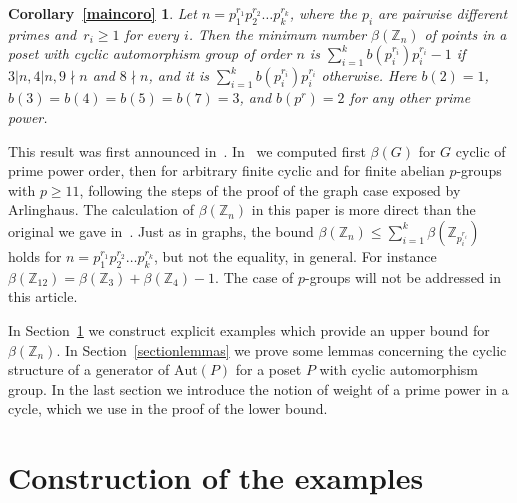 \documentclass[ALCO,published]{cedram}
\newtheorem*{intro1}{Corollary~\ref{maincoro}}
\newcommand{\Z}{\mathbb{Z}}
\newcommand{\aut}{\textrm{Aut}}
\begin{document}
\begin{intro1}
Let $n=p_1^{r_1}p_2^{r_2}\ldots p_k^{r_k}$, where the $p_i$ are pairwise different primes and~$r_i\ge 1$ for every $i$. Then the minimum number $\beta(\Z_n)$ of points in a poset with cyclic automorphism group of order $n$ is $\sum\limits_{i=1}^k b(p_i^{r_i})p_i^{r_i}-1$ if $3|n,4|n,9\! \nmid \! n$ and $8\! \nmid \! n$, and it is $\sum\limits_{i=1}^k b(p_i^{r_i})p_i^{r_i}$ otherwise. Here $b(2)=1$, $b(3)=b(4)=b(5)=b(7)=3$, and $b(p^r)=2$ for any other prime power.
\end{intro1}

This result was first announced in~\cite{Barr}. In~\cite{Barr} we computed first $\beta (G)$ for $G$ cyclic of prime power order, then for arbitrary finite cyclic and for finite abelian $p$-groups with $p\ge 11$, following the steps of the proof of the graph case exposed by Arlinghaus. The calculation of $\beta(\Z_n)$ in this paper is more direct than the original we gave in~\cite{Barr}. Just as in graphs, the bound $\beta (\Z_n)\le \sum\limits_{i=1}^k \beta(\Z_{p_i^{r_i}})$ holds for $n=p_1^{r_1}p_2^{r_2}\ldots p_k^{r_k}$, but not the equality, in general. For instance $\beta(\Z_{12})=\beta(\Z_3)+\beta(\Z_4)-1$. The case of $p$-groups will not be addressed in this article. 

In Section~\ref{sectionexamples} we construct explicit examples which provide an upper bound for~$\beta(\Z_n)$. In Section~\ref{sectionlemmas} we prove some lemmas concerning the cyclic structure of a generator of $\aut (P)$ for a poset $P$ with cyclic automorphism group. In the last section we introduce the notion of weight of a prime power in a cycle, which we use in the proof of the lower bound. 


\section{Construction of the examples} \label{sectionexamples}
\end{document}
